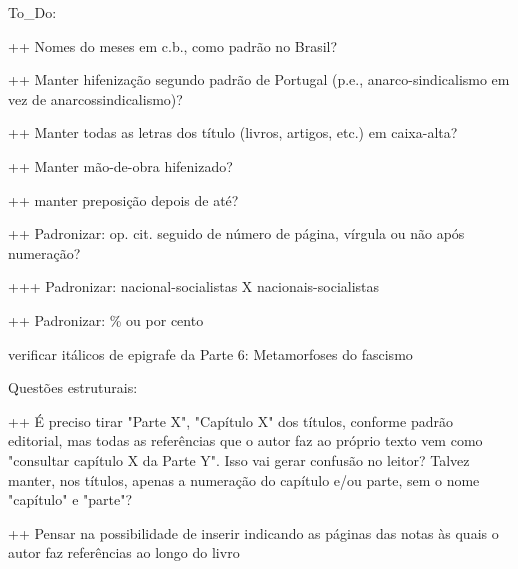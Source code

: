 To_Do:

++ Nomes do meses em c.b., como padrão no Brasil?

++ Manter hifenização segundo padrão de Portugal (p.e., anarco-sindicalismo em vez de anarcossindicalismo)?

++ Manter todas as letras dos título (livros, artigos, etc.) em caixa-alta?

++ Manter mão-de-obra hifenizado?

++ manter preposição depois de até?

++ Padronizar: op. cit. seguido de número de página, vírgula ou não após numeração?


+++ Padronizar: nacional-socialistas X nacionais-socialistas

++ Padronizar: \% ou por cento

verificar itálicos de epigrafe da Parte 6: Metamorfoses do fascismo

Questões estruturais:

++ É preciso tirar "Parte X", "Capítulo X" dos títulos, conforme padrão editorial, mas todas as referências que o autor faz ao próprio texto vem como "consultar capítulo X da Parte Y". Isso vai gerar confusão no leitor? Talvez manter, nos títulos, apenas a numeração do capítulo e/ou parte, sem o nome "capítulo" e "parte"?

++ Pensar na possibilidade de inserir \pageref indicando as páginas das notas às quais o autor faz referências ao longo do livro 

